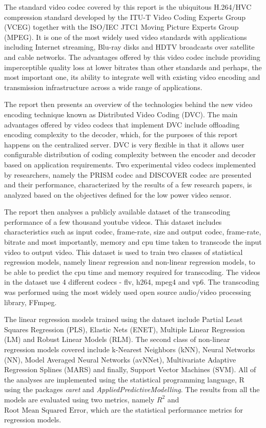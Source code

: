 \documentclass[letterpaper,12pt,titlepage,oneside,final]{report}
\begin{document}
    The standard video codec covered by this report is the ubiquitous H.264/HVC compression standard developed by the ITU-T Video Coding Experts Group (VCEG) together with the ISO/IEC JTC1 Moving Picture Experts Group (MPEG). It is one of the most widely used video standards with applications including Internet streaming, Blu-ray disks and HDTV broadcasts over satellite and cable networks. The advantages offered by this video codec include providing imperceptible quality loss at lower bitrates than other standards and perhaps, the most important one, its ability to integrate well with existing video encoding and transmission infrastructure across a wide range of applications. 

    The report then presents an overview of the technologies behind the new video encoding technique known as Distributed Video Coding (DVC). The main advantages offered by video codecs that implement DVC include offloading encoding complexity to the decoder, which, for the purposes of this report happens on the centralized server. DVC is very flexible in that it allows user configurable distribution of coding complexity between the encoder and decoder based on application requirements. Two experimental video codecs implemented by researchers, namely the PRISM codec and DISCOVER codec are presented and their performance, characterized by the results of a few research papers, is analyzed based on the objectives defined for the low power video sensor. 

    The report then analyses a publicly available dataset of the transcoding performance of a few thousand youtube videos. This dataset includes characteristics such as input codec, frame-rate, size and output codec, frame-rate, bitrate and most importantly, memory and cpu time taken to transcode the input video to output video. This dataset is used to train two classes of statistical regression models, namely linear regression and non-linear regression models, to be able to predict the cpu time and memory required for transcoding. The videos in the dataset use 4 different codecs - flv, h264, mpeg4 and vp6. The transcoding was performed using the most widely used open source audio/video processing library, FFmpeg.

    The linear regression models trained using the dataset include Partial Least Squares Regression (PLS), Elastic Nets (ENET), Multiple Linear Regression (LM) and Robust Linear Models (RLM). The second class of non-linear regression models covered include k-Nearest Neighbors (kNN), Neural Networks (NN), Model Averaged Neural Networks (avNNet), Multivariate Adaptive Regression Splines (MARS) and finally, Support Vector Machines (SVM). All of the analyses are implemented using the statistical programming language, R using the packages \textit{caret} and \textit{AppliedPredictiveModelling}. The results from all the models are evaluated using two metrics, namely $R^2$ and $\text{Root Mean Squared Error}$, which are the statistical performance metrics for regression models.
\end{document}
